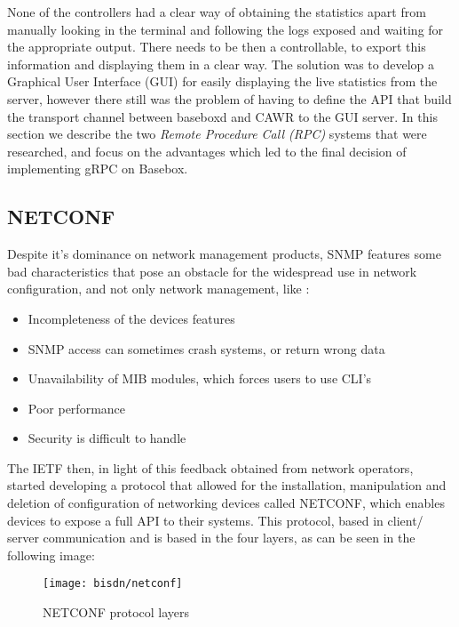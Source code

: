 None of the controllers had a clear way of obtaining the statistics apart from manually looking in the terminal and following the logs exposed and waiting for the appropriate output. There needs to be then a controllable, to export
this information and displaying them in a clear way. The solution was to develop a Graphical User Interface (GUI) for easily displaying the live statistics from the server, however there still was the problem of having to 
define the API that build the transport channel between baseboxd and CAWR to the GUI server. In this section we describe the two \textit {Remote Procedure Call (RPC)} systems that were researched, and focus on the advantages which
led to the final decision of implementing gRPC on Basebox.

\subsection {NETCONF} \label {ssec:netconf}

Despite it's dominance on network management products, SNMP features some bad characteristics that pose an obstacle for the widespread use in network configuration, and not only network management, like 
\cite {CITE - https://tools.ietf.org/html/rfc3535}: 

\begin {itemize}
    \item Incompleteness of the devices features
    \item SNMP access can sometimes crash systems, or return wrong data
    \item Unavailability of MIB modules, which forces users to use CLI's
    \item Poor performance 
    \item Security is difficult to handle
\end {itemize}

\par The IETF then, in light of this feedback obtained from network operators, started developing a protocol that allowed for the installation, manipulation and deletion of configuration of networking devices called NETCONF, which 
enables devices to expose a full API to their systems. This protocol, based in client/ server communication and is based in the four layers, as can be seen in the following image:

\begin{figure} [!htbp]
    \centering
    \texttt{[image: bisdn/netconf]}
    \caption{NETCONF protocol layers \cite {CITE - Basebox architecture}}
\end{figure}

